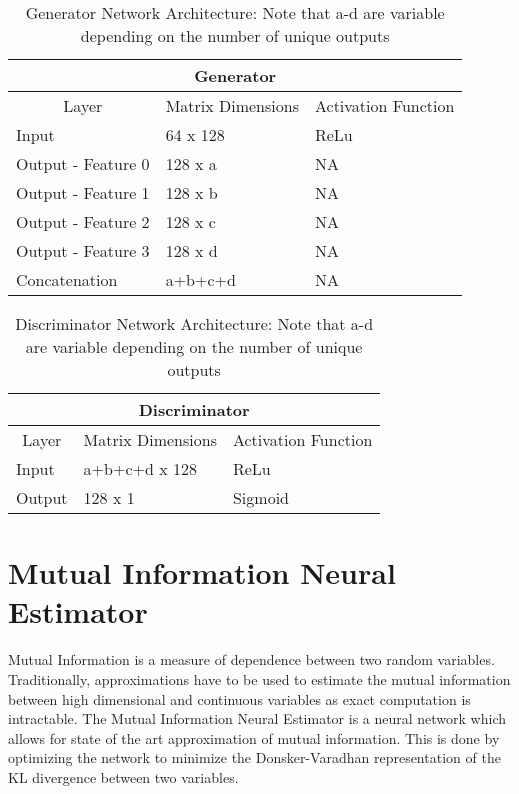 \begin{table}[!htbp]
	\centering
	\label{tab:model_simple_a}
	\caption{Generator Network Architecture: Note that a-d are variable depending on the number of unique outputs}
	\begin{tabular}{l|l|l}
		\hline
		\multicolumn{3}{c}{\textbf{Generator}} \\ 
		\hline
		\multicolumn{1}{c|}{Layer} & \multicolumn{1}{c|}{Matrix Dimensions} & \multicolumn{1}{c}{Activation Function} \\ \hline
		Input & 64 x 128 & ReLu \\
		Output - Feature 0 & 128 x a & NA \\
		Output - Feature 1 & 128 x b & NA \\
		Output - Feature 2 & 128 x c & NA \\
		Output  - Feature 3 & 128 x d & NA \\
		Concatenation & a+b+c+d & NA \\
		\hline
	\end{tabular}
\end{table}

\begin{table}[!htbp]
	\centering
	\label{tab:model_simple_b}
	\caption{Discriminator Network Architecture: Note that a-d are variable depending on the number of unique outputs}
	\begin{tabular}{l|l|l}
		\hline
		\multicolumn{3}{c}{\textbf{Discriminator}} \\ 
		\hline
		\multicolumn{1}{c|}{Layer} & \multicolumn{1}{c|}{Matrix Dimensions} & \multicolumn{1}{c}{Activation Function} \\ \hline
		Input & a+b+c+d x 128 & ReLu \\
		Output & 128 x 1 & Sigmoid \\
		\hline
	\end{tabular}
\end{table}


\section{Mutual Information Neural Estimator}
\label{sec:mine}
Mutual Information is a measure of dependence between two random variables. Traditionally, approximations have to be used to estimate the mutual information between high dimensional and continuous variables as exact computation is intractable. The Mutual Information Neural Estimator is a neural network which allows for state of the art approximation of mutual information. This is done by optimizing the network to minimize the Donsker-Varadhan representation of the KL divergence between two variables. 

